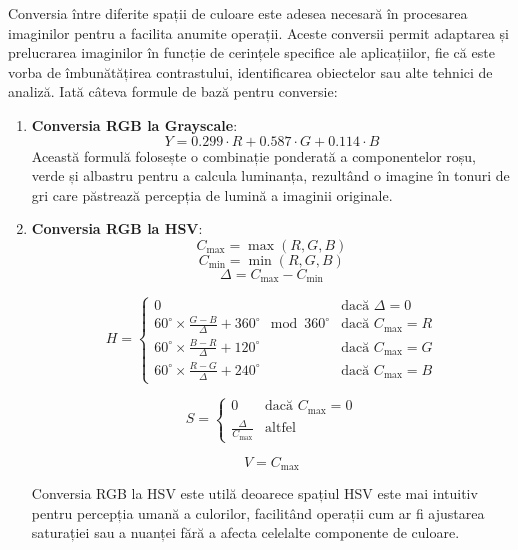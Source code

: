 \documentclass[a4paper,12pt]{report}
\begin{document}
Conversia între diferite spații de culoare este adesea necesară în procesarea imaginilor pentru a facilita anumite operații. Aceste conversii permit adaptarea și prelucrarea imaginilor în funcție de cerințele specifice ale aplicațiilor, fie că este vorba de îmbunătățirea contrastului, identificarea obiectelor sau alte tehnici de analiză. Iată câteva formule de bază pentru conversie:
\begin{enumerate}
    \item \textbf{Conversia RGB la Grayscale}:
          \[
              Y = 0.299 \cdot R + 0.587 \cdot G + 0.114 \cdot B
          \]
          Această formulă folosește o combinație ponderată a componentelor roșu, verde și albastru pentru a calcula luminanța, rezultând o imagine în tonuri de gri care păstrează percepția de lumină a imaginii originale.

    \item \textbf{Conversia RGB la HSV}:
          \[
              C_{\max} = \max(R, G, B)
          \]
          \[
              C_{\min} = \min(R, G, B)
          \]
          \[
              \Delta = C_{\max} - C_{\min}
          \]

          \[
              H = \begin{cases}
                  0                                                               & \text{dacă } \Delta = 0   \\
                  60^\circ \times \frac{G - B}{\Delta} + 360^\circ \mod 360^\circ & \text{dacă } C_{\max} = R \\
                  60^\circ \times \frac{B - R}{\Delta} + 120^\circ                & \text{dacă } C_{\max} = G \\
                  60^\circ \times \frac{R - G}{\Delta} + 240^\circ                & \text{dacă } C_{\max} = B
              \end{cases}
          \]

          \[
              S = \begin{cases}
                  0                       & \text{dacă } C_{\max} = 0 \\
                  \frac{\Delta}{C_{\max}} & \text{altfel}
              \end{cases}
          \]

          \[
              V = C_{\max}
          \]

          Conversia RGB la HSV este utilă deoarece spațiul HSV este mai intuitiv pentru percepția umană a culorilor, facilitând operații cum ar fi ajustarea saturației sau a nuanței fără a afecta celelalte componente de culoare.


\end{enumerate}
\end{document}
